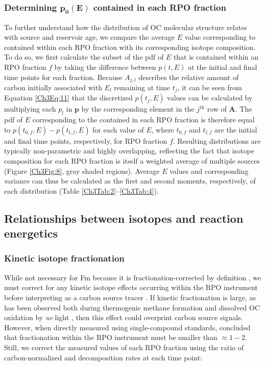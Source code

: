 \subsubsection{Determining $\bm{p_{0}(E)}$ contained in each RPO fraction}

To further understand how the distribution of OC molecular structure relates with source and reservoir age, we compare the average $E$ value corresponding to  contained within each RPO fraction with its corresponding isotope composition. To do so, we first calculate the subset of the pdf of $E$ that is contained within an RPO fraction $f$ by taking the difference between $p(t,E)$ at the initial and final time points for each fraction. Because $A_{j,l}$ describes the relative amount of carbon initially associated with $E_{l}$ remaining at time $t_{j}$, it can be seen from Equation \ref{Ch3Eq:11} that the discretized $p(t_{j},E)$ values can be calculated by multiplying each $p_{l}$ in $\mathbf{p}$ by the corresponding element in the $j^{\text{th}}$ row of $\mathbf{A}$. The pdf of $E$ corresponding to the  contained in each RPO fraction is therefore equal to $p(t_{\text{0},f},E) - p(t_{\text{f},f},E)$ for each value of $E$, where $t_{\text{0},f}$ and $t_{\text{f},f}$ are the initial and final time points, respectively, for RPO fraction $f$. Resulting distributions are typically non-parametric and highly overlapping, reflecting the fact that  isotope composition for each RPO fraction is itself a weighted average of multiple sources (Figure \ref{Ch3Fig:8}, gray shaded regions). Average $E$ values and corresponding variance can thus be calculated as the first and second moments, respectively, of each distribution (Table \ref{Ch3Tab:2}--\ref{Ch3Tab:4}).

\subsection{Relationships between isotopes and reaction energetics}

\subsubsection{Kinetic isotope fractionation}

While not necessary for Fm because it is fractionation-corrected by definition \citep{Stuiver:1977uh,dosSantos:2007ca}, we must correct for any kinetic isotope effects occurring within the RPO instrument before interpreting  as a carbon source tracer \citep{Hemingway:2016rc}. If kinetic fractionation is large, as has been observed both during thermogenic methane formation \citep{Tang:2000ua,Cramer:2004tg} and dissolved OC oxidation by \textit{uv} light \citep{Oba:2008fv}, then this effect could overprint carbon source  signals. However, when directly measured using single-compound standards, \citet{Hemingway:2016rc} concluded that  fractionation within the RPO instrument must be smaller than $\approx 1 - 2$\textperthousand. Still, we correct the measured  values of each RPO fraction using the ratio of carbon-normalized  and  decomposition rates at each time point:

